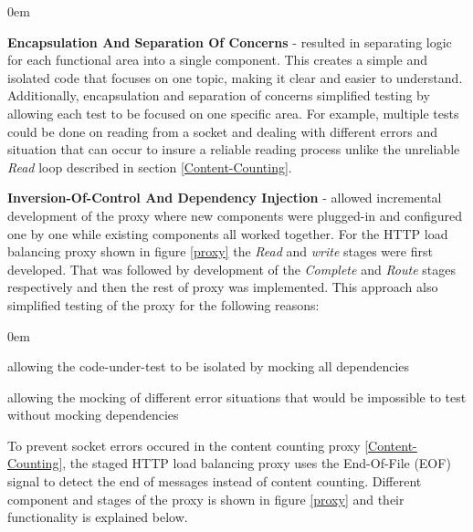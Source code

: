 \documentclass[a4paper,11pt,twoside]{article}
\begin{document}
\begin{list}{-}{}
  \itemsep0em
  \item\textbf{Encapsulation And Separation Of Concerns} - resulted in separating logic for each functional area into a single component. This creates a simple and isolated code that focuses on one topic, making it clear and easier to understand. Additionally, encapsulation and separation of concerns simplified testing by allowing each test to be focused on one specific area. For example, multiple tests could be done on reading from a socket and dealing with different errors and situation that can occur to insure a reliable reading process unlike the unreliable  \textit{Read} loop described in section \ref{Content-Counting}. 

  \item\textbf{Inversion-Of-Control And Dependency Injection} - allowed incremental development of the proxy where new components were plugged-in and configured one by one while existing components all worked together. For the HTTP load balancing proxy shown in figure \ref{proxy} the  \textit{Read} and  \textit{write} stages were first developed. That was followed by development of the  \textit{Complete} and  \textit{Route} stages respectively and then the rest of proxy was implemented. This approach also simplified testing of the proxy for the following reasons:
\begin{list}{-}{}
  \itemsep0em
  \item allowing the code-under-test to be isolated by mocking all dependencies 
  
  \item allowing the mocking of different error situations that would be impossible to test without mocking dependencies
  
\end{list}

\end{list}

\noindent
To prevent socket errors occured in the content counting proxy \ref{Content-Counting}, the staged HTTP load balancing proxy uses the End-Of-File (EOF) signal to detect the end of messages instead of content counting. Different component and stages of the proxy is shown in figure \ref{proxy} and their functionality is explained below.\\
\end{document}
